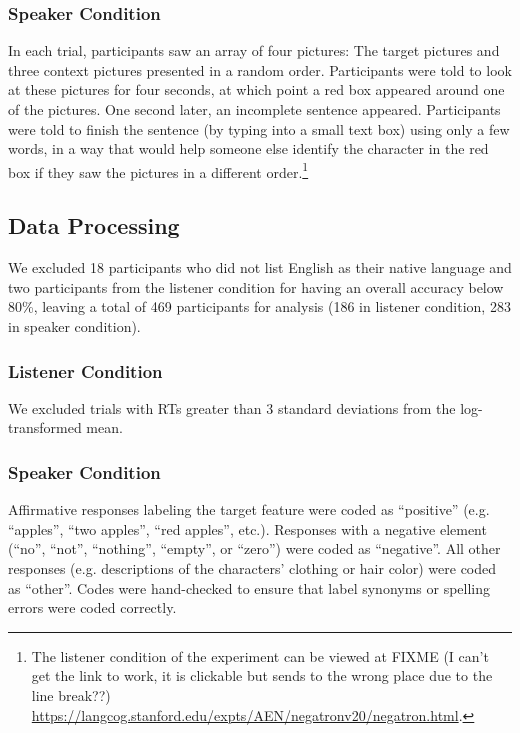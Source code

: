 \documentclass[man, noapacite]{apa2}
\begin{document}
\subsubsection{Speaker Condition}

In each trial, participants saw an array of four pictures: The target pictures and three context pictures presented in a random order.  Participants were told to look at these pictures for four seconds, at which point a red box appeared around one of the pictures.  One second later, an incomplete sentence appeared.  Participants were told to finish the sentence (by typing into a small text box) using only a few words, in a way that would help someone else identify the character in the red box if they saw the pictures in a different order.\footnote{The listener condition of the experiment can be viewed at 
FIXME (I can't get the link to work, it is clickable but sends to the wrong place due to the line break??) \url{https://langcog.stanford.edu/expts/AEN/negatronv20/negatron.html}.}
  

 
 \subsection{Data Processing} 
  
We excluded 18 participants who did not list English as their native language and two participants from the listener condition for having an overall accuracy below 80\%, leaving a total of 469 participants for analysis (186 in listener condition, 283 in speaker condition). 

\subsubsection{Listener Condition}
We excluded trials with RTs greater than 3 standard deviations from the log-transformed mean.  

\subsubsection{Speaker Condition}
Affirmative responses labeling the target feature were coded as ``positive'' (e.g. ``apples'', ``two apples'', ``red apples'', etc.).  Responses with a negative element (``no'', ``not'', ``nothing'', ``empty'', or ``zero'') were coded as ``negative''.  All other responses (e.g. descriptions of the characters' clothing or hair color) were coded as ``other''.  Codes were hand-checked to ensure that label synonyms or spelling errors were coded correctly.  
\end{document}
